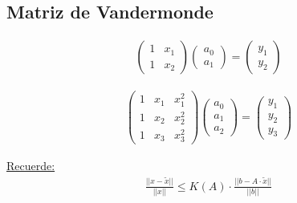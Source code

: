 \newpage




\subsection{Matriz de Vandermonde}
\begin{align*}
\left(\begin{array}{cc}
1 & x_{1} \\ 1 & x_{2}
\end{array}\right)
\left(\begin{array}{cc}
a_{0} \\ a_{1}
\end{array}\right)
=
\left(\begin{array}{cc}
y_{1} \\ y_{2}
\end{array}\right)
\end{align*} 

\begin{align*}
\left(\begin{array}{ccc}
1 & x_{1} & x^2_{1} \\ 1 & x_{2} & x^2_{2} \\ 1 & x_{3} & x^2_{3}
\end{array}\right)
\left(\begin{array}{cc}
a_{0} \\ a_{1} \\ a_{2}
\end{array}\right)
=
\left(\begin{array}{cc}
y_{1} \\ y_{2} \\ y_{3}
\end{array}\right)
\end{align*}

\underline{Recuerde:}
\begin{align*}
 \frac{||x-\tilde{x}||}{||x||} \leq K(A) \cdot \frac{||b-A \cdot \tilde{x} ||}{|| b ||}
\end{align*}

